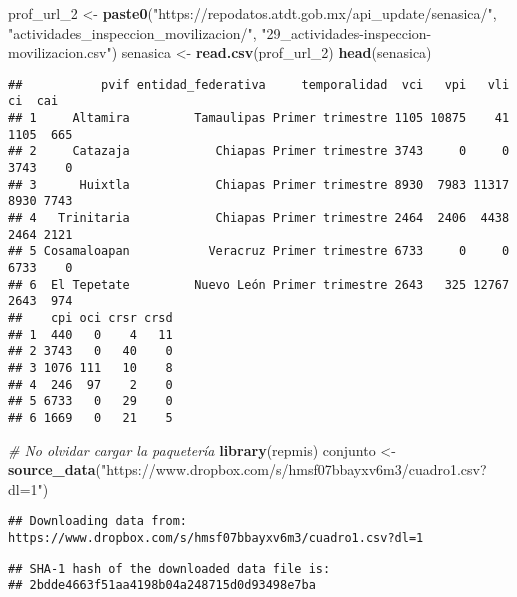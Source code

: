 \documentclass[
]{article}
\newenvironment{Shaded}{\begin{snugshade}}{\end{snugshade}}
\newcommand{\CommentTok}[1]{\textcolor[rgb]{0.56,0.35,0.01}{\textit{#1}}}
\newcommand{\FunctionTok}[1]{\textcolor[rgb]{0.13,0.29,0.53}{\textbf{#1}}}
\newcommand{\NormalTok}[1]{#1}
\newcommand{\OtherTok}[1]{\textcolor[rgb]{0.56,0.35,0.01}{#1}}
\newcommand{\StringTok}[1]{\textcolor[rgb]{0.31,0.60,0.02}{#1}}
\begin{document}
\begin{Shaded}
\begin{Highlighting}[]
\NormalTok{prof\_url\_2 }\OtherTok{\textless{}{-}} \FunctionTok{paste0}\NormalTok{(}\StringTok{"https://repodatos.atdt.gob.mx/api\_update/senasica/"}\NormalTok{,}
                     \StringTok{"actividades\_inspeccion\_movilizacion/"}\NormalTok{,}
                     \StringTok{"29\_actividades{-}inspeccion{-}movilizacion.csv"}\NormalTok{)}
\NormalTok{senasica }\OtherTok{\textless{}{-}} \FunctionTok{read.csv}\NormalTok{(prof\_url\_2)}
\FunctionTok{head}\NormalTok{(senasica)}
\end{Highlighting}
\end{Shaded}

\begin{verbatim}
##           pvif entidad_federativa     temporalidad  vci   vpi   vli   ci  cai
## 1     Altamira         Tamaulipas Primer trimestre 1105 10875    41 1105  665
## 2     Catazaja            Chiapas Primer trimestre 3743     0     0 3743    0
## 3      Huixtla            Chiapas Primer trimestre 8930  7983 11317 8930 7743
## 4   Trinitaria            Chiapas Primer trimestre 2464  2406  4438 2464 2121
## 5 Cosamaloapan           Veracruz Primer trimestre 6733     0     0 6733    0
## 6  El Tepetate         Nuevo León Primer trimestre 2643   325 12767 2643  974
##    cpi oci crsr crsd
## 1  440   0    4   11
## 2 3743   0   40    0
## 3 1076 111   10    8
## 4  246  97    2    0
## 5 6733   0   29    0
## 6 1669   0   21    5
\end{verbatim}

\begin{Shaded}
\begin{Highlighting}[]
\CommentTok{\# No olvidar cargar la paquetería}
\FunctionTok{library}\NormalTok{(repmis)}
\NormalTok{conjunto }\OtherTok{\textless{}{-}} \FunctionTok{source\_data}\NormalTok{(}\StringTok{"https://www.dropbox.com/s/hmsf07bbayxv6m3/cuadro1.csv?dl=1"}\NormalTok{)}
\end{Highlighting}
\end{Shaded}

\begin{verbatim}
## Downloading data from: https://www.dropbox.com/s/hmsf07bbayxv6m3/cuadro1.csv?dl=1
\end{verbatim}

\begin{verbatim}
## SHA-1 hash of the downloaded data file is:
## 2bdde4663f51aa4198b04a248715d0d93498e7ba
\end{verbatim}
\end{document}
